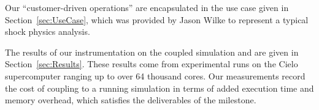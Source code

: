 Our ``customer-driven operations'' are encapsulated in the use case given
in Section~\ref{sec:UseCase}, which was provided by Jason Wilke to 
represent a typical shock physics analysis.

The results of our instrumentation on the coupled simulation and \vda are
given in Section~\ref{sec:Results}.  These results come from experimental
runs on the Cielo supercomputer ranging up to over 64
thousand cores.  Our measurements record the cost of coupling \vda to a
running simulation in terms of added execution time and memory overhead,
which satisfies the deliverables of the milestone.
